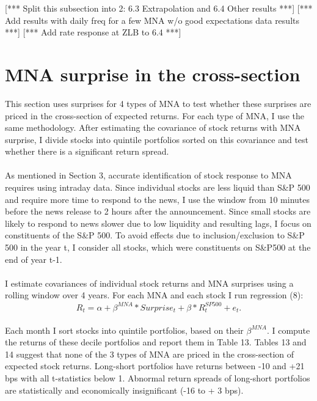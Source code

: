 \documentclass[12pt]{article}
\begin{document}
[*** Split this subsection into 2: 6.3 Extrapolation and 6.4 Other results ***]
[*** Add results with daily freq for a few MNA w/o good expectations data results ***]
[*** Add rate response at ZLB to 6.4 ***]

\section{MNA surprise in the cross-section} \label{sec:Model}

This section uses surprises for 4 types of MNA to test whether these surprises are priced in the cross-section of expected returns. For each type of MNA, I use the same methodology. After estimating the covariance of stock returns with MNA surprise, I divide stocks into quintile portfolios sorted on this covariance and test whether there is a significant return spread.
\paragraph{}
As mentioned in Section 3, accurate identification of stock response to MNA requires using intraday data. Since individual stocks are less liquid than S\&P 500 and require more time to respond to the news, I use the window from 10 minutes before the news release to 2 hours after the announcement. Since small stocks are likely to respond to news slower due to low liquidity and resulting lags, I focus on constituents of the S\&P 500. To avoid effects due to inclusion/exclusion to S\&P 500 in the year t, I consider all stocks, which were constituents on S\&P500 at the end of year t-1.
\paragraph{}
I estimate covariances of individual stock returns and MNA surprises using a rolling window over 4 years. For each MNA and each stock I run regression (8):
\begin{equation}
   R_t = \alpha + \beta^{MNA} * Surprise_t + \beta*R^{SP500}_t + e_t.
\end{equation}
\paragraph{}
Each month I sort stocks into quintile portfolios, based on their $\beta^{MNA}$. I compute the returns of these decile portfolios and report them in Table 13. Tables 13 and 14 suggest that none of the 3 types of MNA are priced in the cross-section of expected stock returns. Long-short portfolios have returns between -10 and +21 bps with all t-statistics below 1. Abnormal return spreads of long-short portfolios are statistically and economically insignificant (-16 to + 3 bps).
\end{document}
